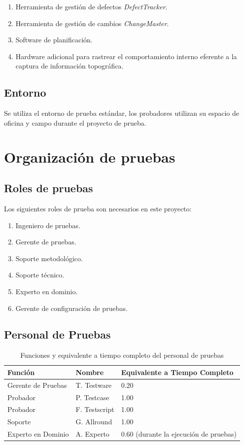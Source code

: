\documentclass[12pt,a4paper, twoside]{article} %
\begin{document}
\begin{enumerate}
  \item Herramienta de gestión de defectos \textit{DefectTracker}.
  \item Herramienta de gestión de cambios \textit{ChangeMaster}.
  \item Software de planificación.
  \item Hardware adicional para rastrear el comportamiento interno eferente a la captura de información topográfica.
\end{enumerate}

\subsection{Entorno}

Se utiliza el entorno de prueba estándar, los probadores utilizan su espacio de oficina y campo durante el proyecto de prueba.

\section{Organización de pruebas}

\subsection{Roles de pruebas}

Los siguientes roles de prueba son necesarios en este proyecto:

\begin{enumerate}
  \item Ingeniero de pruebas.
  \item Gerente de pruebas.
  \item Soporte metodológico.
  \item Soporte técnico.
  \item Experto en dominio.
  \item Gerente de configuración de pruebas.
\end{enumerate}


\subsection{Personal de Pruebas}

\begin{table}[h]
\centering
\begin{tabular}{|l |l |l|}
\hline
\textbf{Función} & \textbf{Nombre} & \textbf{Equivalente a Tiempo Completo} \\
\hline
Gerente de Pruebas & T. Testware & 0.20 \\
Probador & P. Testcase & 1.00 \\
Probador & F. Testscript & 1.00 \\
Soporte & G. Allround & 1.00 \\
Experto en Dominio & A. Experto & 0.60 (durante la ejecución de pruebas) \\
\hline
\end{tabular}
\caption{Funciones y equivalente a tiempo completo del personal de pruebas}
\label{tab:test_staff}
\end{table}
\end{document}
